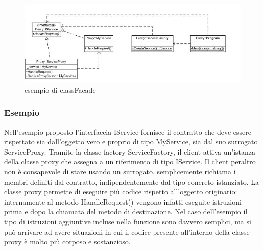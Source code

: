 \documentclass[a4paper,10pt]{article}
\begin{document}
            \begin{figure}[h!] %
                \centering
                \includegraphics[scale=0.90]{img/IC119095}	
                \caption{esempio di classFacade}
            \end{figure}
    
            \newpage
            \subsubsection{Esempio}
            Nell’esempio proposto l’interfaccia IService fornisce il contratto che deve essere rispettato sia dall’oggetto vero e proprio di tipo MyService, sia dal suo surrogato ServiceProxy. Tramite la classe factory ServiceFactory, il client attiva un’istanza della classe proxy che assegna a un riferimento di tipo IService. Il client peraltro non è consapevole di stare usando un surrogato, semplicemente richiama i membri definiti dal contratto, indipendentemente dal tipo concreto istanziato. La classe proxy permette di eseguire più codice rispetto all’oggetto originario: internamente al metodo HandleRequest() vengono infatti eseguite istruzioni prima e dopo la chiamata del metodo di destinazione. Nel caso dell’esempio il tipo di istruzioni aggiuntive incluse nella funzione sono davvero semplici, ma si può arrivare ad avere situazioni in cui il codice presente all’interno della classe proxy è molto più corposo e sostanzioso.
\end{document}
